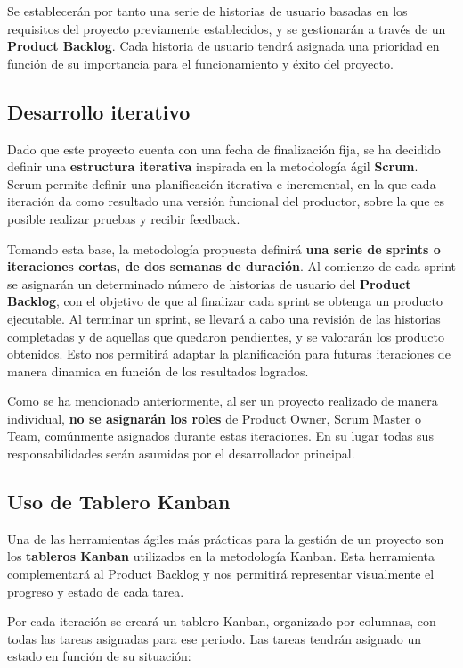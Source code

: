 Se establecerán por tanto una serie de historias de usuario basadas en los requisitos del proyecto previamente establecidos, y se gestionarán a través de un \textbf{Product Backlog}. Cada historia de usuario tendrá asignada una prioridad en función de su importancia para el funcionamiento y éxito del proyecto.

\subsection{Desarrollo iterativo}

Dado que este proyecto cuenta con una fecha de finalización fija, se ha decidido definir una \textbf{estructura iterativa} inspirada en la metodología ágil \textbf{Scrum}. Scrum permite definir una planificación iterativa e incremental, en la que cada iteración da como resultado una versión funcional del productor, sobre la que es posible realizar pruebas y recibir feedback. 

Tomando esta base, la metodología propuesta definirá \textbf{una serie de sprints o iteraciones cortas, de dos semanas de duración}. Al comienzo de cada sprint se asignarán un determinado número de historias de usuario del \textbf{Product Backlog}, con el objetivo de que al finalizar cada sprint se obtenga un producto ejecutable. Al terminar un sprint, se llevará a cabo una revisión de las historias completadas y de aquellas que quedaron pendientes, y se valorarán los producto obtenidos. Esto nos permitirá adaptar la planificación para futuras iteraciones de manera dinamica en función de los resultados logrados.

Como se ha mencionado anteriormente, al ser un proyecto realizado de manera individual, \textbf{no se asignarán los roles} de Product Owner, Scrum Master o Team, comúnmente asignados durante estas iteraciones. En su lugar todas sus responsabilidades serán asumidas por el desarrollador principal.

\subsection{Uso de Tablero Kanban}

Una de las herramientas ágiles más prácticas para la gestión de un proyecto son los \textbf{tableros Kanban} utilizados en la metodología Kanban. Esta herramienta complementará al Product Backlog y nos permitirá representar visualmente el progreso y estado de cada tarea.

Por cada iteración se creará un tablero Kanban, organizado por columnas, con todas las tareas asignadas para ese periodo. Las tareas tendrán asignado un estado en función de su situación:

